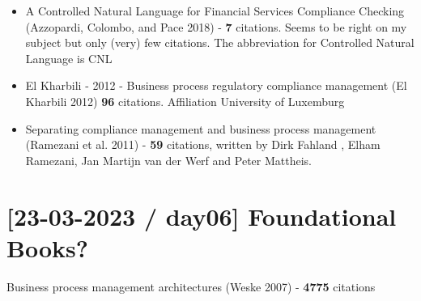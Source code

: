\documentclass[
  letterpaper,
  DIV=11,
  numbers=noendperiod]{scrreprt}
\begin{document}
\begin{itemize}
\item
  A Controlled Natural Language for Financial Services Compliance
  Checking (Azzopardi, Colombo, and Pace 2018) - \textbf{7} citations.
  Seems to be right on my subject but only (very) few citations. The
  abbreviation for Controlled Natural Language is CNL
\item
  El Kharbili - 2012 - Business
  process regulatory compliance management (El Kharbili 2012)
  \textbf{96} citations. Affiliation University of Luxemburg
\item
  Separating compliance management and business process management
  (Ramezani et al. 2011) - \textbf{59} citations, written by Dirk
  Fahland
  ,
  Elham Ramezani, Jan Martijn van der
  Werf
  and Peter Mattheis.
\end{itemize}

\hypertarget{day06-foundational-books}{%
\section{{[}23-03-2023 / day06{]} Foundational
Books?}\label{day06-foundational-books}}

\begin{tcolorbox}[enhanced jigsaw, opacityback=0, rightrule=.15mm, colbacktitle=quarto-callout-tip-color!10!white, coltitle=black, leftrule=.75mm, titlerule=0mm, toptitle=1mm, colframe=quarto-callout-tip-color-frame, colback=white, breakable, bottomtitle=1mm, bottomrule=.15mm, arc=.35mm, title=\textcolor{quarto-callout-tip-color}{\faLightbulb}\hspace{0.5em}{\href{https://bpt.hpi.uni-potsdam.de/people/mathias-weske/}{Mathias
Weske, Universität Potsdam}}, opacitybacktitle=0.6, toprule=.15mm, left=2mm]


Business process management architectures (Weske 2007) - \textbf{4775}
citations

\end{tcolorbox}
\end{document}
